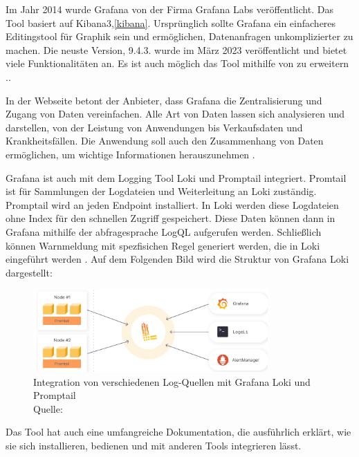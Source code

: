 Im Jahr 2014 wurde Grafana von der Firma Grafana Labs veröffentlicht. Das Tool basiert auf Kibana3,\ref{kibana}. Ursprünglich sollte Grafana ein einfacheres Editingstool für Graphik sein und ermöglichen, Datenanfragen unkomplizierter zu machen. Die neuste Version, 9.4.3. wurde im März 2023 veröffentlicht und bietet viele Funktionalitäten an. Es ist auch möglich das Tool mithilfe von   zu erweitern \citep{Oedegaard_historyGrafana}.. 

In der Webseite betont der Anbieter, dass Grafana die Zentralisierung und Zugang von Daten vereinfachen. Alle Art von Daten lassen sich analysieren und darstellen, von der Leistung von Anwendungen bis Verkaufsdaten und Krankheitsfällen. Die Anwendung soll auch den Zusammenhang von Daten ermöglichen, um wichtige Informationen herauszunehmen \citep{Grafana_Grafana}.

Grafana ist auch mit dem Logging Tool Loki und Promptail integriert. Promtail ist für Sammlungen der Logdateien und Weiterleitung an Loki zuständig. Promptail wird an jeden \gls{Endpoint} installiert. In Loki werden diese Logdateien ohne Index für den schnellen Zugriff gespeichert. Diese Daten können dann in Grafana mithilfe der \gls{abfragesprache} LogQL aufgerufen werden. Schließlich können Warnmeldung mit spezfisichen Regel generiert werden, die in Loki eingeführt werden \citep{Grafana_loki}. Auf dem Folgenden Bild wird die Struktur von Grafana Loki  dargestellt:

\begin{figure}[H]
   \centering
   \includegraphics[width=0.8\textwidth]{assets/2_p10.png}
   \caption[Integration von Log-Quellen mit Grafana Loki und Promptail]
   {Integration von verschiedenen Log-Quellen mit Grafana Loki und Promptail \\Quelle: \citep{Grafana_Logs}}
   \centering
\end{figure}

Das Tool hat auch eine umfangreiche Dokumentation, die ausführlich erklärt, wie sie sich installieren, bedienen und mit anderen Tools integrieren lässt. 



